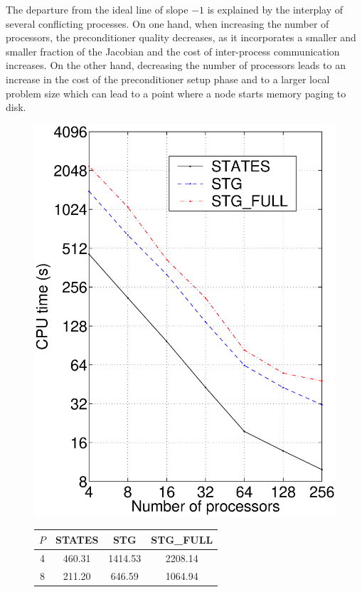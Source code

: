 The departure from the ideal line of slope $-1$ is explained by the 
interplay of several conflicting processes. On one hand, when increasing the 
number of processors, the preconditioner quality decreases, as it incorporates 
a smaller and smaller fraction of the Jacobian and the cost of inter-process 
communication increases. On the other hand, decreasing the number of processors
leads to an increase in the cost of the preconditioner setup phase and to a larger
local problem size which can lead to a point where a node starts memory paging to disk.

\begin{figure}
  \begin{minipage}[c]{.5\textwidth}
    \centering
    \includegraphics[width=.85\textwidth]{speedup.eps}
  \end{minipage}
  \begin{minipage}[c]{.5\textwidth}
    \centering
    \begin{tabularx}{\textwidth}{cccc}\hline
      $P$ &  STATES  &   STG   & STG\_FULL \\ \hline
      4  &  460.31  &  1414.53  & 2208.14  \\
      8  &  211.20  &   646.59  & 1064.94  \\

\end{tabularx}
\end{minipage}
\end{figure}
